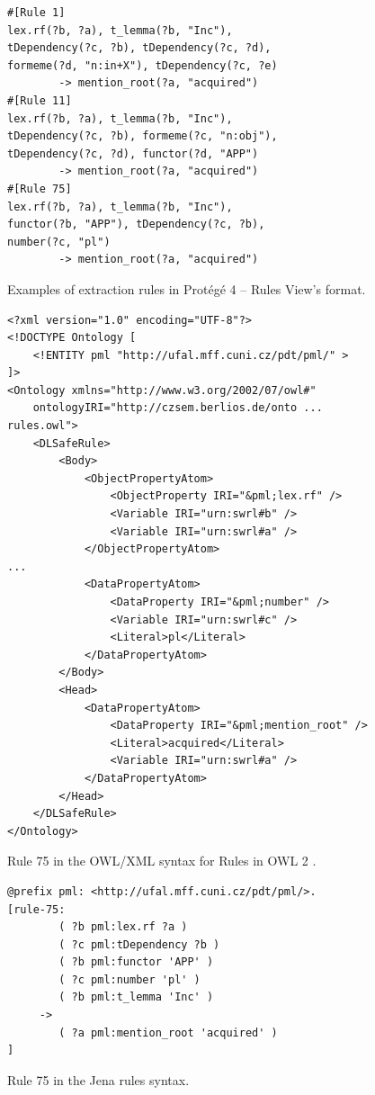 \begin{figure}
\begin{verbatim}
#[Rule 1]
lex.rf(?b, ?a), t_lemma(?b, "Inc"),
tDependency(?c, ?b), tDependency(?c, ?d),
formeme(?d, "n:in+X"), tDependency(?c, ?e)
		-> mention_root(?a, "acquired")
#[Rule 11]
lex.rf(?b, ?a), t_lemma(?b, "Inc"),
tDependency(?c, ?b), formeme(?c, "n:obj"),
tDependency(?c, ?d), functor(?d, "APP")
		-> mention_root(?a, "acquired")
#[Rule 75]
lex.rf(?b, ?a), t_lemma(?b, "Inc"),
functor(?b, "APP"), tDependency(?c, ?b),
number(?c, "pl")
		-> mention_root(?a, "acquired")							
\end{verbatim}
	\caption{Examples of extraction rules in Prot\'{e}g\'{e} 4 -- Rules View's format.}
	\label{img:rules_protege}
\end{figure}

\begin{figure}
\begin{verbatim}
<?xml version="1.0" encoding="UTF-8"?>
<!DOCTYPE Ontology [
	<!ENTITY pml "http://ufal.mff.cuni.cz/pdt/pml/" >
]>
<Ontology xmlns="http://www.w3.org/2002/07/owl#"
	ontologyIRI="http://czsem.berlios.de/onto ... rules.owl">
	<DLSafeRule>
		<Body>
			<ObjectPropertyAtom>
				<ObjectProperty IRI="&pml;lex.rf" />
				<Variable IRI="urn:swrl#b" />
				<Variable IRI="urn:swrl#a" />
			</ObjectPropertyAtom>
...
			<DataPropertyAtom>
				<DataProperty IRI="&pml;number" />
				<Variable IRI="urn:swrl#c" />
				<Literal>pl</Literal>
			</DataPropertyAtom>
		</Body>
		<Head>
			<DataPropertyAtom>
				<DataProperty IRI="&pml;mention_root" />
				<Literal>acquired</Literal>
				<Variable IRI="urn:swrl#a" />
			</DataPropertyAtom>
		</Head>
	</DLSafeRule>
</Ontology>
\end{verbatim}
\caption{Rule 75 in the OWL/XML syntax for Rules in OWL 2 \citep{GHPP09a}.}
\label{img:rules_xml}
\end{figure}


\begin{figure}
\begin{verbatim}
@prefix pml: <http://ufal.mff.cuni.cz/pdt/pml/>.
[rule-75:  
        ( ?b pml:lex.rf ?a )
        ( ?c pml:tDependency ?b )
        ( ?b pml:functor 'APP' )
        ( ?c pml:number 'pl' )
        ( ?b pml:t_lemma 'Inc' )
     -> 
        ( ?a pml:mention_root 'acquired' )
]
\end{verbatim}
\caption{Rule 75 in the Jena rules syntax.}
\label{img:rules_jena}
\end{figure}


